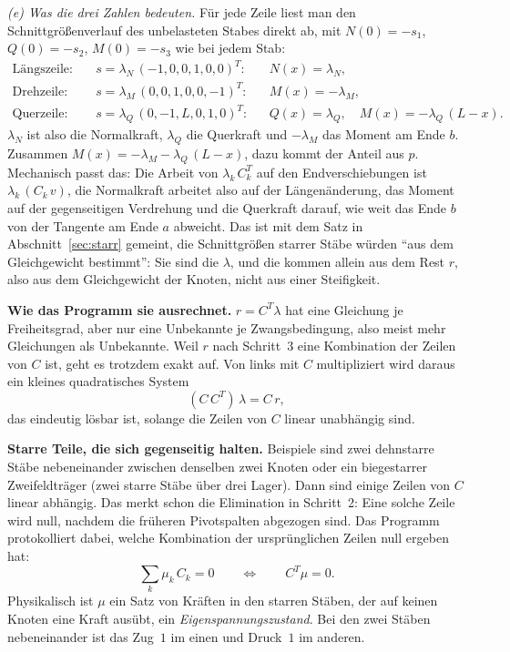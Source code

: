 \emph{(e) Was die drei Zahlen bedeuten.} Für jede Zeile liest man den Schnittgrößenverlauf des
unbelasteten Stabes direkt ab, mit $N(0) = -s_1$, $Q(0) = -s_2$, $M(0) = -s_3$ wie bei jedem Stab:
\begin{align*}
  \text{Längszeile:}\quad & s = \lambda_N\,(-1, 0, 0, 1, 0, 0)^T: && N(x) = \lambda_N, \\
  \text{Drehzeile:}\quad  & s = \lambda_M\,(0, 0, 1, 0, 0, -1)^T: && M(x) = -\lambda_M, \\
  \text{Querzeile:}\quad  & s = \lambda_Q\,(0, -1, L, 0, 1, 0)^T: && Q(x) = \lambda_Q, \quad
                                                                     M(x) = -\lambda_Q\,(L - x) .
\end{align*}
$\lambda_N$ ist also die Normalkraft, $\lambda_Q$ die Querkraft und $-\lambda_M$ das Moment am Ende
$b$. Zusammen $M(x) = -\lambda_M - \lambda_Q\,(L - x)$, dazu kommt der Anteil aus $p$. Mechanisch
passt das: Die Arbeit von $\lambda_k\,C_k^T$ auf den Endverschiebungen ist $\lambda_k\,(C_k\,v)$,
die Normalkraft arbeitet also auf der Längenänderung, das Moment auf der gegenseitigen Verdrehung
und die Querkraft darauf, wie weit das Ende $b$ von der Tangente am Ende $a$ abweicht. Das ist mit
dem Satz in Abschnitt~\ref{sec:starr} gemeint, die Schnittgrößen starrer Stäbe würden \enquote{aus
dem Gleichgewicht bestimmt}: Sie sind die $\lambda$, und die kommen allein aus dem Rest $r$, also aus
dem Gleichgewicht der Knoten, nicht aus einer Steifigkeit.

\textbf{Wie das Programm sie ausrechnet.} $r = C^T\lambda$ hat eine Gleichung je Freiheitsgrad, aber
nur eine Unbekannte je Zwangsbedingung, also meist mehr Gleichungen als Unbekannte. Weil $r$ nach
Schritt~3 eine Kombination der Zeilen von $C$ ist, geht es trotzdem exakt auf. Von links mit $C$
multipliziert wird daraus ein kleines quadratisches System
\[
  (C\,C^T)\,\lambda = C\,r ,
\]
das eindeutig lösbar ist, solange die Zeilen von $C$ linear unabhängig sind.

\textbf{Starre Teile, die sich gegenseitig halten.} Beispiele sind zwei dehnstarre Stäbe
nebeneinander zwischen denselben zwei Knoten oder ein biegestarrer Zweifeldträger (zwei starre
Stäbe über drei Lager). Dann sind einige Zeilen von $C$ linear abhängig. Das merkt schon die
Elimination in Schritt~2: Eine solche Zeile wird null, nachdem die früheren Pivotspalten abgezogen
sind. Das Programm protokolliert dabei, welche Kombination der ursprünglichen Zeilen null ergeben
hat:
\[
  \sum_k \mu_k\,C_k = 0 \qquad\Longleftrightarrow\qquad C^T\mu = 0 .
\]
Physikalisch ist $\mu$ ein Satz von Kräften in den starren Stäben, der auf keinen Knoten eine Kraft
ausübt, ein \emph{Eigenspannungszustand}. Bei den zwei Stäben nebeneinander ist das Zug~$1$ im
einen und Druck~$1$ im anderen.

